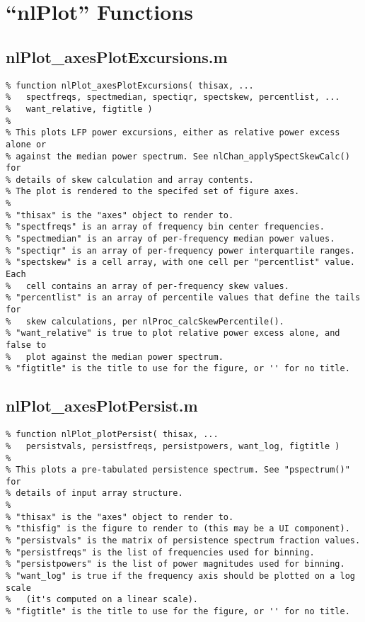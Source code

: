 \chapter{``nlPlot'' Functions}
\label{sect-plot}

\section{nlPlot\_axesPlotExcursions.m}

\begin{verbatim}
% function nlPlot_axesPlotExcursions( thisax, ...
%   spectfreqs, spectmedian, spectiqr, spectskew, percentlist, ...
%   want_relative, figtitle )
%
% This plots LFP power excursions, either as relative power excess alone or
% against the median power spectrum. See nlChan_applySpectSkewCalc() for
% details of skew calculation and array contents.
% The plot is rendered to the specifed set of figure axes.
%
% "thisax" is the "axes" object to render to.
% "spectfreqs" is an array of frequency bin center frequencies.
% "spectmedian" is an array of per-frequency median power values.
% "spectiqr" is an array of per-frequency power interquartile ranges.
% "spectskew" is a cell array, with one cell per "percentlist" value. Each
%   cell contains an array of per-frequency skew values.
% "percentlist" is an array of percentile values that define the tails for
%   skew calculations, per nlProc_calcSkewPercentile().
% "want_relative" is true to plot relative power excess alone, and false to
%   plot against the median power spectrum.
% "figtitle" is the title to use for the figure, or '' for no title.
\end{verbatim}

\section{nlPlot\_axesPlotPersist.m}

\begin{verbatim}
% function nlPlot_plotPersist( thisax, ...
%   persistvals, persistfreqs, persistpowers, want_log, figtitle )
%
% This plots a pre-tabulated persistence spectrum. See "pspectrum()" for
% details of input array structure.
%
% "thisax" is the "axes" object to render to.
% "thisfig" is the figure to render to (this may be a UI component).
% "persistvals" is the matrix of persistence spectrum fraction values.
% "persistfreqs" is the list of frequencies used for binning.
% "persistpowers" is the list of power magnitudes used for binning.
% "want_log" is true if the frequency axis should be plotted on a log scale
%   (it's computed on a linear scale).
% "figtitle" is the title to use for the figure, or '' for no title.
\end{verbatim}

